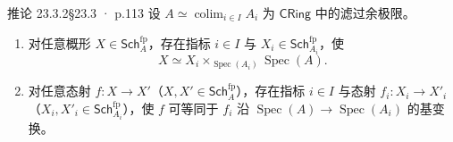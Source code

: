\documentclass[UTF8,10pt,fontset=windows]{ctexart}
\newcommand{\Spec}{\operatorname{Spec}}\newcommand{\Spm}{\operatorname{Spm}}
\newcommand{\colim}{\operatorname*{colim}}
\newcommand{\CRing}{\mathsf{CRing}}\newcommand{\Ring}{\mathsf{Ring}}
\newcommand{\Sch}{\mathsf{Sch}}\newcommand{\PShv}{\mathsf{PShv}}
\begin{document}
\begin{card}{推论 23.3.2}{§23.3 · p.113}
设 $A \simeq \colim_{i \in I} A_i$ 为 $\CRing$ 中的滤过余极限。
\begin{enumerate}[label=(\roman*),leftmargin=2em,itemsep=0.25ex]
  \item 对任意概形 $X \in \Sch^{\mathrm{fp}}_A$，存在指标 $i \in I$ 与 $X_i \in \Sch^{\mathrm{fp}}_{A_i}$，使
  \[
  X \simeq X_i \times_{\Spec(A_i)} \Spec(A).
  \]
  \item 对任意态射 $f\colon X \to X'$（$X, X' \in \Sch^{\mathrm{fp}}_A$），存在指标 $i \in I$ 与态射 $f_i\colon X_i \to X'_i$（$X_i, X'_i \in \Sch^{\mathrm{fp}}_{A_i}$），使 $f$ 可等同于 $f_i$ 沿 $\Spec(A) \to \Spec(A_i)$ 的基变换。
\end{enumerate}
\end{card}
\end{document}
